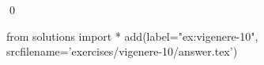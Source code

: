
\begin{ex} 
  \label{ex:vigenere-10}
  
  \qed
\end{ex} 
\begin{python0}
from solutions import *
add(label="ex:vigenere-10",
    srcfilename='exercises/vigenere-10/answer.tex') 
\end{python0}
